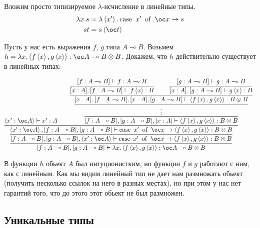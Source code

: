 Вложим просто типизируемое $\lambda$-исчисление в линейные типы.
\begin{align*}
	\lambda x.s &= \lambda\pair{x'}.\caseb{x'}{\oc x \to s} \\
	st          &= s\pair{\oc t}
\end{align*}
\begin{example}
	Пусть у нас есть выражения $f$, $g$  типа $A \multimap B$.
	Возьмем $h = \lambda x.\pair{f\pair{x}, g\pair{x}} : \oc A \multimap B \otimes B$.
	Докажем, что $h$ действительно существует в линейных типах:

	\[
		\infer[]{[f : A \multimap B], [g : A\multimap B]\vdash \lambda x.\pair{f\pair{x}, g\pair{x}} : \oc A \multimap B \otimes B}{
			\infer[]{
				[f : A \multimap B], [g : A \multimap B], \pair{x' : \oc A}
				\vdash \caseb{x'}{\oc x \to \pair{f\pair{x}, g\pair{x}} : B \otimes B}
			}{
				\infer[]{
					\pair{x' : \oc A}, [f : A \multimap B], [g : A \multimap B]
				\vdash \caseb{x'}{\oc x \to \pair{f\pair{x}, g\pair{x}} : B \otimes B}
				}{
					\pair{x' : \oc A} \vdash x' : A &&
					\infer[]{[f : A \multimap B], [g : A \multimap B], [x : A]\vdash \pair{f\pair{x}, g\pair{x}} : B \otimes B}{
						\infer[]{\vdots}{
						\infer[]{[x : A], [f : A \multimap B], [x : A], [g : A \multimap B]\vdash \pair{f\pair{x}, g\pair{x}} : B \otimes B}{
								\infer[]{[x : A], [f : A \multimap B]\vdash f\pair{x} : B}{[f : A \multimap B] \vdash f : A \multimap B}
								&&
								\infer[]{[x : A], [g : A \multimap B]\vdash g\pair{x} : B}{[g : A \multimap B] \vdash g : A \multimap B}
							}
						}
					}
				}
			}
		}
	\]

	В функции $h$ обьект $A$ был интуционистким, но функции $f$ и $g$ работают с ним, как с линейным.
	Как мы видим линейный тип не дает нам размножать обьект (получить несколько ссылок на него в разных местах),
	но при этом у нас нет гарантий того, что до этого этот обьект не был размножен.
\end{example}

\subsection{\texorpdfstring{Уникальные типы}{Unique types}}

\newcommand{\ruleVarU}[0]{\mathtt{Var^\odot}}
\newcommand{\ruleVarS}[0]{\mathtt{Var^\otimes}}
\newcommand{\ruleAbs}[0]{\mathtt{Abs}}
\newcommand{\ruleApp}[0]{\mathtt{App}}

